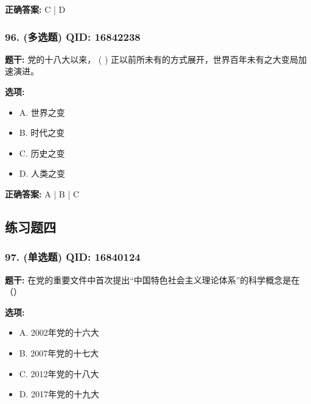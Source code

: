 \documentclass[12pt,UTF8]{ctexart}
\begin{document}
\textbf{正确答案:}
C | D

\vspace{0.3em}\hrulefill\vspace{0.7em}

\subsubsection*{96. (多选题) \small QID: 16842238}

\textbf{题干:}
党的十八大以来， ( ) 正以前所未有的方式展开，世界百年未有之大变局加速演进。

\textbf{选项:}
\begin{itemize}[leftmargin=*]

  \item A. 世界之变

  \item B. 时代之变

  \item C. 历史之变

  \item D. 人类之变

\end{itemize}

\textbf{正确答案:}
A | B | C

\vspace{0.3em}\hrulefill\vspace{0.7em}

\subsection*{练习题四}

\subsubsection*{97. (单选题) \small QID: 16840124}

\textbf{题干:}
在党的重要文件中首次提出“中国特色社会主义理论体系”的科学概念是在（）

\textbf{选项:}
\begin{itemize}[leftmargin=*]

  \item A. 2002年党的十六大

  \item B. 2007年党的十七大

  \item C. 2012年党的十八大

  \item D. 2017年党的十九大

\end{itemize}
\end{document}
